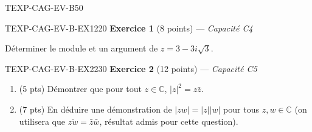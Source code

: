 

\begin{evaluation}{TEXP-CAG-EV-B}{50}

\begin{exercice}{TEXP-CAG-EV-B-EX1}{2}{20}
\textbf{Exercice 1} (8 points) --- \textit{Capacité C4}

\medskip

Déterminer le module et un argument de $z=3-3i\sqrt{3}$.
\end{exercice}

\begin{exercice}{TEXP-CAG-EV-B-EX2}{2}{30}
\textbf{Exercice 2} (12 points) --- \textit{Capacité C5}

\medskip

\begin{enumerate}
  \item (5 pts) Démontrer que pour tout $z\in\mathbb{C}$, $|z|^2=z\bar z$.
  \item (7 pts) En déduire une démonstration de $|zw|=|z||w|$ pour tous $z,w\in\mathbb{C}$ (on utilisera que $\overline{zw}=\bar z\bar w$, résultat admis pour cette question).
\end{enumerate}
\end{exercice}

\end{evaluation}
